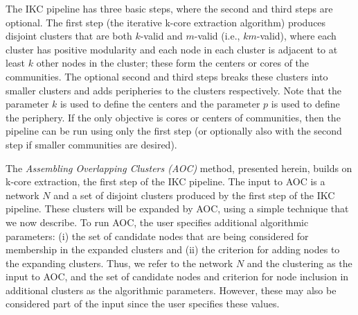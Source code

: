 \documentclass[12pt, oneside]{article}   	%
\begin{document}
The IKC pipeline has three basic steps, where the second and third steps are optional.  The first step (the iterative k-core extraction algorithm) produces disjoint clusters that are both $k$-valid and $m$-valid (i.e.,  $km$-valid), where each cluster has positive modularity and each node in each cluster is adjacent to at least $k$ other nodes in the cluster; these form the centers or cores of the communities. The optional second and third steps breaks these clusters into smaller clusters and adds peripheries to the clusters respectively.  Note that the parameter $k$ is used to define the centers and the parameter $p$ is used to define the periphery. If the only objective is cores or centers of communities, then the pipeline can be run using only the first step (or optionally also with the second step if smaller communities are desired).

	
The \emph{Assembling Overlapping Clusters (AOC)} method, presented herein, builds on k-core extraction, the first step of the IKC pipeline. The input to AOC is a network $N$ and a set of disjoint clusters produced by the first step of the IKC pipeline. These clusters will be expanded by AOC,  using a simple technique that we now describe. To run AOC, the user specifies additional algorithmic parameters:  (i) the set of candidate nodes that are being considered for membership in the expanded clusters and  (ii) the criterion for adding nodes to the expanding clusters. 
Thus, we refer to the network $N$ and the clustering as the input to AOC, and the set of candidate nodes and criterion for node inclusion in additional clusters as the algorithmic parameters. However, these may also be considered part of the input since the user specifies these values.
\end{document}
